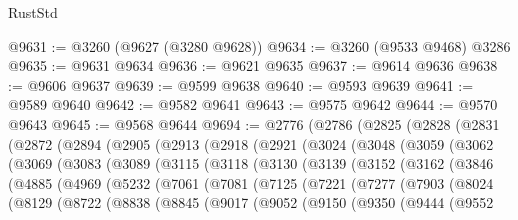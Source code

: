 \begin{lexlean}{RustStd}
\begin{coremodule}
@9631 := @3260 (@9627 (@3280 @9628))
@9634 := @3260 (@9533 @9468) @3286
@9635 := @9631 @9634
@9636 := @9621 @9635
@9637 := @9614 @9636
@9638 := @9606 @9637
@9639 := @9599 @9638
@9640 := @9593 @9639
@9641 := @9589 @9640
@9642 := @9582 @9641
@9643 := @9575 @9642
@9644 := @9570 @9643
@9645 := @9568 @9644
@9694 := @2776
    (@2786
      (@2825
        (@2828
          (@2831
            (@2872
              (@2894
                (@2905
                  (@2913
                    (@2918
                      (@2921
                        (@3024
                          (@3048
                            (@3059
                              (@3062
                                (@3069
                                  (@3083
                                    (@3089
                                      (@3115
                                        (@3118
                                          (@3130
                                            (@3139
                                              (@3152
                                                (@3162
                                                  (@3846
                                                    (@4885
                                                      (@4969
                                                        (@5232
                                                          (@7061
                                                            (@7081
                                                              (@7125
                                                                (@7221
                                                                  (@7277
                                                                    (@7903
                                                                      (@8024
                                                                        (@8129
                                                                          (@8722
                                                                            (@8838
                                                                              (@8845
                                                                                (@9017
                                                                                  (@9052
                                                                                    (@9150
                                                                                      (@9350
                                                                                        (@9444
                                                                                          (@9552

\end{coremodule}
\end{lexlean}
